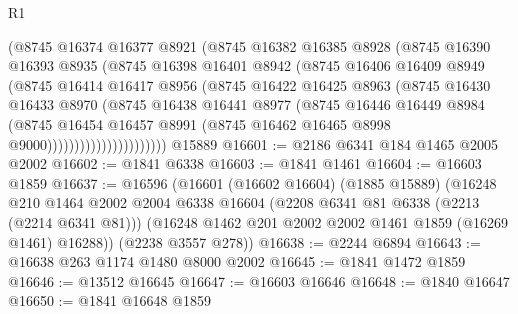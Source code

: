 \begin{lexlean}{R1}
\begin{coremodule}
                        (@8745
                          @16374
                          @16377
                          @8921
                          (@8745
                            @16382
                            @16385
                            @8928
                            (@8745
                              @16390
                              @16393
                              @8935
                              (@8745
                                @16398
                                @16401
                                @8942
                                (@8745
                                  @16406
                                  @16409
                                  @8949
                                  (@8745
                                    @16414
                                    @16417
                                    @8956
                                    (@8745
                                      @16422
                                      @16425
                                      @8963
                                      (@8745
                                        @16430
                                        @16433
                                        @8970
                                        (@8745
                                          @16438
                                          @16441
                                          @8977
                                          (@8745
                                            @16446
                                            @16449
                                            @8984
                                            (@8745
                                              @16454
                                              @16457
                                              @8991
                                              (@8745 @16462 @16465 @8998 @9000))))))))))))))))))))))
    @15889
@16601 := @2186 @6341 @184 @1465 @2005 @2002
@16602 := @1841 @6338
@16603 := @1841 @1461
@16604 := @16603 @1859
@16637 := @16596
    (@16601
      (@16602 @16604)
      (@1885 @15889)
      (@16248
        @210
        @1464
        @2002
        @2004
        @6338
        @16604
        (@2208 @6341 @81 @6338 (@2213 (@2214 @6341 @81)))
        (@16248 @1462 @201 @2002 @2002 @1461 @1859 (@16269 @1461) @16288))
      (@2238 @3557 @278))
@16638 := @2244 @6894
@16643 := @16638 @263 @1174 @1480 @8000 @2002
@16645 := @1841 @1472 @1859
@16646 := @13512 @16645
@16647 := @16603 @16646
@16648 := @1840 @16647
@16650 := @1841 @16648 @1859

\end{coremodule}
\end{lexlean}
